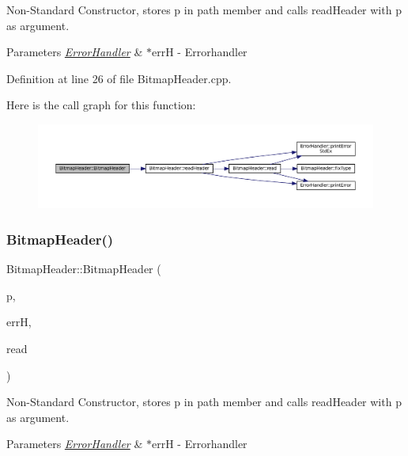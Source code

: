 Non-\/\+Standard Constructor, stores p in path member and calls read\+Header with p as argument. 


\begin{DoxyParams}{Parameters}
{\em \mbox{\hyperlink{classErrorHandler}{Error\+Handler}}} & $\ast$errH -\/ Errorhandler \\
\hline
\end{DoxyParams}


Definition at line 26 of file Bitmap\+Header.\+cpp.

Here is the call graph for this function\+:\nopagebreak
\begin{figure}[H]
\begin{center}
\leavevmode
\includegraphics[width=350pt]{classBitmapHeader_a2cf57f049eae7d2ee93d5749d678aca5_cgraph}
\end{center}
\end{figure}
\mbox{\label{classBitmapHeader_aa0bf5c2238f213b36d7b85d4b7f90be1}} 
\subsubsection{\texorpdfstring{BitmapHeader()}{BitmapHeader()}\hspace{0.1cm}{\footnotesize\ttfamily [3/4]}}
{\footnotesize\ttfamily Bitmap\+Header\+::\+Bitmap\+Header (\begin{DoxyParamCaption}\item[{std\+::string}]{p,  }\item[{\mbox{\hyperlink{classErrorHandler}{Error\+Handler}} $\ast$}]{errH,  }\item[{bool}]{read }\end{DoxyParamCaption})}



Non-\/\+Standard Constructor, stores p in path member and calls read\+Header with p as argument. 


\begin{DoxyParams}{Parameters}
{\em \mbox{\hyperlink{classErrorHandler}{Error\+Handler}}} & $\ast$errH -\/ Errorhandler \\
\hline
\end{DoxyParams}


